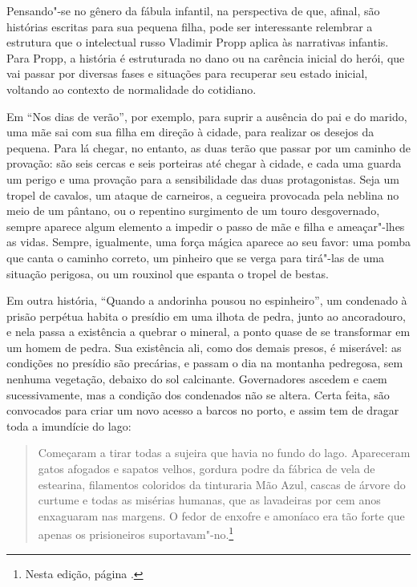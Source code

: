 Pensando"-se no gênero da fábula infantil, na perspectiva de que, afinal, são histórias escritas para sua pequena filha, pode ser interessante relembrar a estrutura que o intelectual russo Vladimir Propp aplica às narrativas infantis. Para Propp, a história é estruturada no dano ou na carência inicial do herói, que vai passar por diversas fases e situações para recuperar seu estado inicial, voltando ao contexto de normalidade do cotidiano.

Em ``Nos dias de verão'', por exemplo, para suprir a ausência do pai e do marido, uma mãe sai com sua filha em direção à cidade, para realizar os desejos da pequena. Para lá chegar, no entanto, as duas terão que passar por um caminho de provação: são seis cercas e seis porteiras até chegar à cidade, e cada uma guarda um perigo e uma provação para a sensibilidade das duas protagonistas. Seja um tropel de cavalos, um ataque de carneiros, a cegueira provocada pela neblina no meio de um pântano, ou o repentino surgimento de um touro desgovernado, sempre aparece algum elemento a impedir o passo de mãe e filha e ameaçar"-lhes as vidas. Sempre, igualmente, uma força mágica aparece ao seu favor: uma pomba que canta o caminho correto, um pinheiro que se verga para tirá"-las de uma situação perigosa, ou um rouxinol que espanta o tropel de bestas.

Em outra história, ``Quando a
andorinha pousou no espinheiro'',  um condenado à prisão perpétua habita
o presídio em uma ilhota de pedra, junto ao ancoradouro, e nela passa a
existência a quebrar o mineral, a ponto quase de se transformar em um homem de pedra. Sua existência ali, como dos demais presos, é miserável: as condições no presídio são precárias, e passam o dia na montanha pedregosa, sem nenhuma vegetação, debaixo do sol calcinante. Governadores ascedem e caem sucessivamente, mas a condição dos condenados não se altera. Certa feita, são convocados para criar um novo acesso a barcos no porto, e assim tem de dragar toda a imundície do lago:

\begin{quote}
Começaram a tirar todas a sujeira que havia no fundo do lago. Apareceram
gatos afogados e sapatos velhos, gordura podre da fábrica de vela de
estearina, filamentos coloridos da tinturaria Mão Azul, cascas de
árvore do curtume e todas as misérias humanas, que as lavadeiras por
cem anos enxaguaram nas margens. O fedor de enxofre e amoníaco era tão
forte que apenas os prisioneiros suportavam"-no.\footnote{Nesta edição, página \pageref{lago}.}
\end{quote}

